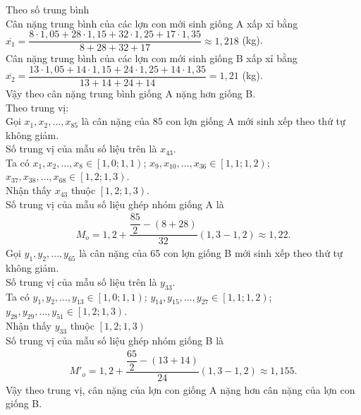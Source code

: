 \begin{ex}
{\begin{enumerate}
\begin{longtable}{|*{5}{c|}}
				\hline 
			\end{longtable}
			Theo số trung  bình\\
			Cân nặng trung bình của các lợn con mới  sinh giống A xấp xỉ bằng\\
			$\overline{x_1}=\dfrac{8\cdot 1{,}05+28\cdot  1{,}15+32\cdot 1{,}25+17\cdot 1{,}35}{8+28+32+17} \approx 1{,}218$ (kg).\\
			Cân nặng trung  bình của các lợn con mới sinh giống B xấp xỉ bằng\\
			$\overline{x_2}=\dfrac{13\cdot 1{,}05+14\cdot 1{,}15+24\cdot  1{,}25+14\cdot 1{,}35}{13+14+24+14}=1{,}21$ (kg).\\
			Vậy theo cân nặng trung bình giống A nặng hơn giống B.\\ 
			 Theo trung vị:\\
			Gọi $x_1, x_2, \ldots, x_{85}$ là cân nặng của $85$ con lợn  giống A mới sinh xếp theo thứ tự không giảm.\\
			Số  trung vị của mẫu số liệu trên là $x_{43}$.\\
			Ta có $x_1, x_2, \ldots, x_8 \in \left[1{,}0; 1{,}1\right)$; $x_9, x_{10}, \ldots, x_{36} \in \left[1{,}1; 1{,}2\right)$; $x_{37},  x_{38}, \ldots, x_{68} \in \left[1{,}2; 1{,}3\right)$.\\
			Nhận  thấy $x_{43}$ thuộc $\left[1{,}2; 1{,}3\right)$.\\
			Số trung vị của mẫu số liệu ghép nhóm giống A là 
			\begin{align*}
				M_o=1{,}2+\dfrac{\dfrac{85}{2}-\left(8+28\right)}{32} \left(1{,}3-1{,}2\right)\approx  1{,}22.
			\end{align*}
			Gọi $y_1, y_2, \ldots, y_{65}$ là cân nặng của 65 con lợn giống B mới sinh xếp  theo thứ tự không giảm.\\
			Số trung vị của mẫu số liệu trên  là $y_{33}$.\\
			Ta có $y_1, y_2, \ldots, y_{13} \in \left[1{,}0; 1{,}1\right)$; $y_{14}, y_{15}, \ldots, y_{27} \in \left[1{,}1; 1{,}2\right)$;  $y_{28}, y_{29}, \ldots, y_{51} \in \left[1{,}2; 1{,}3\right)$.\\
			Nhận  thấy $y_{33}$ thuộc $\left[1{,}2; 1{,}3\right)$\\
			Số trung vị của mẫu số liệu ghép nhóm giống  B là
			\begin{align*}
				M'_o =1{,}2+\dfrac{\dfrac{65}{2}-\left(13+14\right)}{24} \left(1{,}3-1{,}2\right)\approx 1{,}155. 
			\end{align*}
			Vậy theo trung vị, cân nặng của lợn con giống A  nặng hơn cân nặng của lợn con giống B.

\end{enumerate}}
\end{ex}
